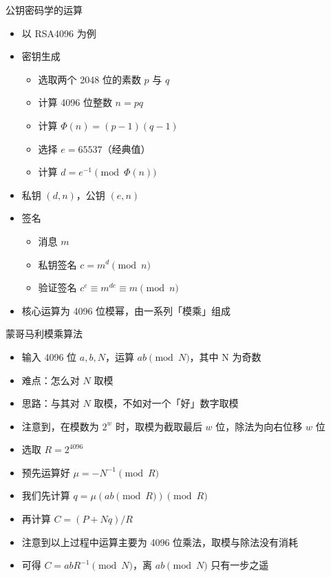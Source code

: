 \documentclass[aspectratio=169]{ctexbeamer}
\begin{document}
\begin{frame}{公钥密码学的运算}
  \begin{itemize}
    \item<1-> 以 RSA4096 为例
    \item<1-> 密钥生成\begin{itemize}
      \item 选取两个 2048 位的素数 $p$ 与 $q$
      \item 计算 4096 位整数 $n=pq$
      \item 计算 $\Phi(n)=(p-1)(q-1)$
      \item 选择 $e = 65537$（经典值）
      \item 计算 $d = e^{-1} \pmod{\Phi(n)}$
    \end{itemize}
    \item<1-> 私钥 $(d, n)$，公钥 $(e, n)$
    \item<2-> 签名\begin{itemize}
      \item 消息 $m$
      \item 私钥签名 $c = m ^ {d} \pmod{n}$
      \item 验证签名 $c ^ {e} \equiv m^{de} \equiv m \pmod {n}$
    \end{itemize}
    \item<3-> 核心运算为 4096 位模幂，由一系列「模乘」组成
  \end{itemize}
\end{frame}

\begin{frame}{蒙哥马利模乘算法}
  \begin{itemize}
    \item<1-> 输入 4096 位 $a, b, N$，运算 $ab \pmod{N}$，其中 N 为奇数
    \item<1-> 难点：怎么对 $N$ 取模
    \item<2-> 思路：与其对 $N$ 取模，不如对一个「好」数字取模
    \item<3-> 注意到，在模数为 $2^w$ 时，取模为截取最后 $w$ 位，除法为向右位移 $w$ 位
    \item<3-> 选取 $R = 2^{4096}$
    \item<4-> 预先运算好 $\mu = -N^{-1} \pmod{R}$
    \item<4-> 我们先计算 $q = \mu(ab \pmod{R}) \pmod {R}$
    \item<4-> 再计算 $C = (P+Nq) / R$
    \item<4-> 注意到以上过程中运算主要为 4096 位乘法，取模与除法没有消耗
    \item<4-> 可得 $C = abR^{-1} \pmod{N}$，离 $ab \pmod{N}$ 只有一步之遥
  \end{itemize}
\end{frame}
\end{document}
